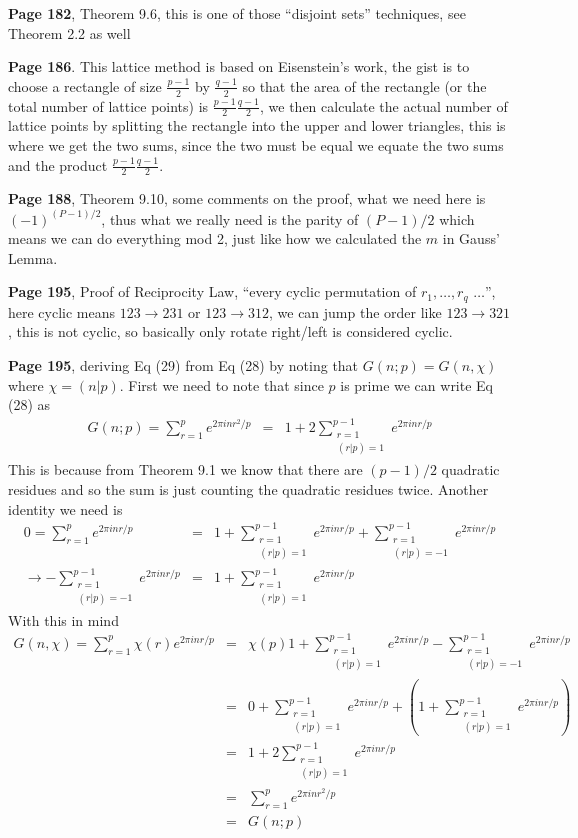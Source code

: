\documentclass[aps,preprint,preprintnumbers,nofootinbib,showpacs,prd]{revtex4-1}
\newcommand{\nbea}{\begin{eqnarray*}}
\newcommand{\neea}{\end{eqnarray*}}
\begin{document}
{\bf Page 182}, Theorem 9.6, this is one of those ``disjoint sets'' techniques, see Theorem 2.2 as well

{\bf Page 186}. This lattice method is based on Eisenstein's work, the gist is to choose a rectangle of size $\frac{p-1}{2}$ by $\frac{q-1}{2}$ so that the area of the rectangle (or the total number of lattice points) is $\frac{p-1}{2}\frac{q-1}{2}$, we then calculate the actual number of lattice points by splitting the rectangle into the upper and lower triangles, this is where we get the two sums, since the two must be equal we equate the two sums and the product $\frac{p-1}{2}\frac{q-1}{2}$.

{\bf Page 188}, Theorem 9.10, some comments on the proof, what we need here is $(-1)^{(P-1)/2}$, thus what we really need is the parity of $(P-1)/2$ which means we can do everything mod 2, just like how we calculated the $m$ in Gauss' Lemma.

{\bf Page 195}, Proof of Reciprocity  Law, ``every cyclic permutation of $r_1, \dots, r_q$ $\dots$'', here cyclic means $123 \to 231$ or $123 \to 312$, we can jump the order like $123 \to 321$, this is not cyclic, so basically only rotate right/left is considered cyclic.

{\bf Page 195}, deriving Eq (29) from Eq (28) by noting that $G(n;p) = G(n, \chi)$ where $\chi = (n|p)$. First we need to note that since $p$ is prime we can write Eq (28) as
%
\nbea
G(n;p) = \sum_{r=1}^{p} e^{2\pi i n r^2/p} & = & 1 + 2\sum_{\substack{r=1\\(r|p) = 1}}^{p-1} e^{2\pi i n r/p}
\neea
%
This is because from Theorem 9.1 we know that there are $(p-1)/2$ quadratic residues and so the sum is just counting the quadratic residues twice. Another identity we need is
%
\nbea
0 = \sum_{r=1}^p e^{2\pi i n r/p} & = & 1 + \sum_{\substack{r=1\\(r|p)=1}}^{p-1} e^{2\pi i n r/p} + \sum_{\substack{r=1\\(r|p)=-1}}^{p-1} e^{2\pi i n r/p} \\
\to -\sum_{\substack{r=1\\(r|p)=-1}}^{p-1} e^{2\pi i n r/p} & = & 1 + \sum_{\substack{r=1\\(r|p)=1}}^{p-1} e^{2\pi i n r/p}
\neea
%
With this in mind 
%
\nbea
G(n,\chi) = \sum_{r=1}^p \chi(r) e^{2\pi i n r/p} & = & \chi(p)1 + \sum_{\substack{r=1\\(r|p)=1}}^{p-1} e^{2\pi i n r/p} - \sum_{\substack{r=1\\(r|p)=-1}}^{p-1} e^{2\pi i n r/p} \\
& = & 0 + \sum_{\substack{r=1\\(r|p)=1}}^{p-1} e^{2\pi i n r/p} + (1 + \sum_{\substack{r=1\\(r|p)=1}}^{p-1} e^{2\pi i n r/p}) \\
& = & 1 + 2\sum_{\substack{r=1\\(r|p)=1}}^{p-1} e^{2\pi i n r/p} \\
& = & \sum_{r=1}^{p} e^{2\pi i n r^2/p} \\
& = & G(n;p)
\neea
%
\end{document}
